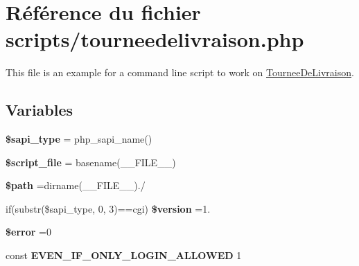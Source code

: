 \hypertarget{scripts_2tourneedelivraison_8php}{}\section{Référence du fichier scripts/tourneedelivraison.php}
\label{scripts_2tourneedelivraison_8php}


This file is an example for a command line script to work on \hyperlink{classTourneeDeLivraison}{Tournee\+De\+Livraison}.  


\subsection*{Variables}
\begin{DoxyCompactItemize}
\item 
\mbox{\label{scripts_2tourneedelivraison_8php_a86e02f00a36d0fcbf274de973b2640d0}} 
{\bfseries \$sapi\+\_\+type} = php\+\_\+sapi\+\_\+name()
\item 
\mbox{\label{scripts_2tourneedelivraison_8php_a97b9f047572d6c50f29fbea522f6c17e}} 
{\bfseries \$script\+\_\+file} = basename(\+\_\+\+\_\+\+F\+I\+L\+E\+\_\+\+\_\+)
\item 
\mbox{\label{scripts_2tourneedelivraison_8php_a0a4baf0b22973c07685c3981f0d17fc4}} 
{\bfseries \$path} =dirname(\+\_\+\+\_\+\+F\+I\+L\+E\+\_\+\+\_\+).\textquotesingle{}/\textquotesingle{}
\item 
\mbox{\label{scripts_2tourneedelivraison_8php_a0a351317886caa2358df1658880c0c78}} 
if(substr(\$sapi\+\_\+type, 0, 3)==\textquotesingle{}cgi\textquotesingle{}) {\bfseries \$version} =\textquotesingle{}1.\textquotesingle{}
\item 
\mbox{\label{scripts_2tourneedelivraison_8php_aeba2ab722cedda53dbb7ec1a59f45550}} 
{\bfseries \$error} =0
\item 
\mbox{\label{scripts_2tourneedelivraison_8php_a2b87986264c1ca3cddb96a106af7b37a}} 
const {\bfseries E\+V\+E\+N\+\_\+\+I\+F\+\_\+\+O\+N\+L\+Y\+\_\+\+L\+O\+G\+I\+N\+\_\+\+A\+L\+L\+O\+W\+ED} 1

\end{DoxyCompactItemize}
